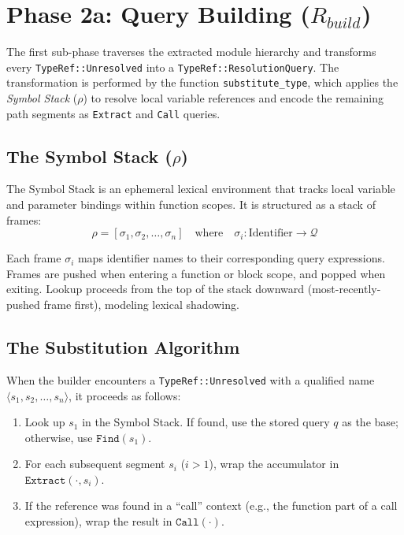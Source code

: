 \section{Phase 2a: Query Building ($R_{build}$)}
\label{sec:query_building}

The first sub-phase traverses the extracted module hierarchy and
transforms every \texttt{TypeRef::Unresolved} into a
\texttt{TypeRef::ResolutionQuery}. The transformation is performed by
the function \texttt{substitute\_type}, which applies the
\textit{Symbol Stack} ($\rho$) to resolve local variable references
and encode the remaining path segments as \texttt{Extract} and
\texttt{Call} queries.

\subsection{The Symbol Stack ($\rho$)}

The Symbol Stack is an ephemeral lexical environment that tracks
local variable and parameter bindings within function scopes. It is
structured as a stack of frames:
$$\rho = [\sigma_1, \sigma_2, \ldots, \sigma_n] \quad \text{where}
\quad \sigma_i : \text{Identifier} \to \mathcal{Q}$$

Each frame $\sigma_i$ maps identifier names to their corresponding
query expressions. Frames are pushed when entering a function or
block scope, and popped when exiting. Lookup proceeds from the top of
the stack downward (most-recently-pushed frame first), modeling
lexical shadowing.

\subsection{The Substitution Algorithm}

When the builder encounters a \texttt{TypeRef::Unresolved} with a
qualified name $\langle s_1, s_2, \ldots, s_n \rangle$, it proceeds as follows:
\begin{enumerate}
  \item Look up $s_1$ in the Symbol Stack. If found, use the stored
    query $q$ as the base; otherwise, use $\texttt{Find}(s_1)$.
  \item For each subsequent segment $s_i$ ($i > 1$), wrap the
    accumulator in $\texttt{Extract}(\cdot, s_i)$.
  \item If the reference was found in a ``call'' context (e.g., the
    function part of a call expression), wrap the result in
    $\texttt{Call}(\cdot)$.
\end{enumerate}

